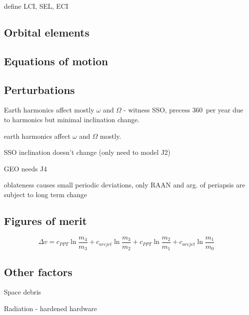 define LCI, SEL, ECI

\subsection{Orbital elements}
\subsection{Equations of motion}
\subsection{Perturbations}
Earth harmonics affect mostly $\omega$ and $\Omega$ - witness SSO, precess 360\degrees\ per year due to harmonics but minimal inclination change.

earth harmonics affect $\omega$ and $\Omega$ mostly. \textcite{Eshagh2007} 

SSO inclination doesn't change (only need to model J2)

GEO needs J4

oblateness causes small periodic deviations, only RAAN and arg. of periapsis are subject to long term change \textcite{Montenbruck2000}

\subsection{Figures of merit}
\begin{equation}
\Delta v= c_{PPT}\ln\frac{m_4}{m_3}+c_{arcjet}\ln\frac{m_3}{m_2}+c_{PPT}\ln\frac{m_2}{m_1}+c_{arcjet}\ln\frac{m_1}{m_0}
\end{equation}

\subsection{Other factors}
Space debris

Radiation - hardened hardware

